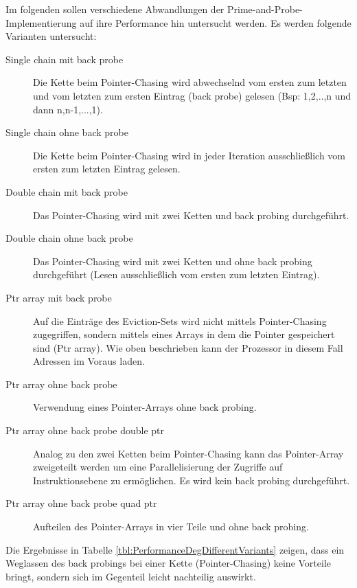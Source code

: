 Im folgenden sollen verschiedene Abwandlungen der Prime-and-Probe-Implementierung auf ihre Performance hin untersucht werden. Es werden folgende Varianten untersucht:

\begin{description}
\item[Single chain mit back probe]
Die Kette beim Pointer-Chasing wird abwechselnd vom ersten zum letzten und vom letzten zum ersten Eintrag (back probe) gelesen (Bsp: 1,2,..,n und dann n,n-1,...,1).
\item[Single chain ohne back probe]
Die Kette beim Pointer-Chasing wird in jeder Iteration ausschließlich vom ersten zum letzten Eintrag gelesen. 
\item[Double chain mit back probe]
Das Pointer-Chasing wird mit zwei Ketten und back probing durchgeführt.
\item[Double chain ohne back probe]
Das Pointer-Chasing wird mit zwei Ketten und ohne back probing durchgeführt (Lesen ausschließlich vom ersten zum letzten Eintrag).
\item[Ptr array mit back probe]
Auf die Einträge des Eviction-Sets wird nicht mittels Pointer-Chasing zugegriffen, sondern mittels eines Arrays in dem die Pointer gespeichert sind (Ptr array). Wie oben beschrieben kann der Prozessor in diesem Fall Adressen im Voraus laden.
\item[Ptr array ohne back probe]
Verwendung eines Pointer-Arrays ohne back probing.
\item[Ptr array ohne back probe double ptr]
Analog zu den zwei Ketten beim Pointer-Chasing kann das Pointer-Array zweigeteilt werden um eine Parallelisierung der Zugriffe auf Instruktionsebene zu ermöglichen. Es wird kein back probing durchgeführt.
\item[Ptr array ohne back probe quad ptr]
Aufteilen des Pointer-Arrays in vier Teile und ohne back probing.
\end{description}

Die Ergebnisse in Tabelle \ref{tbl:PerformanceDegDifferentVariants} zeigen, dass ein Weglassen des back probings bei einer Kette (Pointer-Chasing) keine Vorteile bringt, sondern sich im Gegenteil leicht nachteilig auswirkt.



